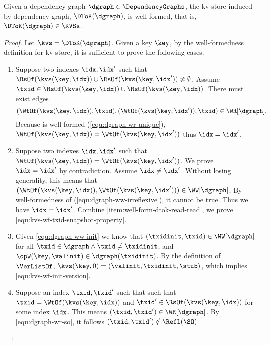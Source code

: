 \begin{toappendix}
\label{sec:proof-dep-graph-to-kvs}
\begin{proposition}
\label{prop:dtok-well-defined}
Given a dependency graph \( \dgraph \in \DependencyGraphs \), 
the kv-store induced by dependency graph, \( \DToK(\dgraph) \), is well-formed,
that is, \( \DToK(\dgraph) \in \KVSs\).
\end{proposition}
\begin{proof}
Let \( \kvs = \DToK(\dgraph) \).
Given a key \( \key \), by the well-formedness definition for kv-store,
it is sufficient to prove the following cases.
\begin{enumerate}
\item \label{item:well-form-dtok-read-read} Suppose two indexes \( \idx, \idx' \) 
    such that \( \RsOf(\kvs(\key,\idx)) \cup \RsOf(\kvs(\key,\idx')) \neq \emptyset \).
    Assume \( \txid \in \RsOf(\kvs(\key,\idx)) \cup \RsOf(\kvs(\key,\idx)) \).
    There must exist edges
    \[ (\WtOf(\kvs(\key,\idx)),\txid), (\WtOf(\kvs(\key,\idx')),\txid) \in \WR[\dgraph]. \]
    Because \dgraph is well-formed (\cref{equ:dgraph-wr-unique}), 
    \( \WtOf(\kvs(\key,\idx)) = \WtOf(\kvs(\key,\idx')) \) thus \( \idx = \idx' \).
\item Suppose two indexes \( \idx, \idx' \) 
    such that \( \WtOf(\kvs(\key,\idx)) = \WtOf(\kvs(\key,\idx')) \).
    We prove \( \idx = \idx' \) by contradiction.
    Assume \( \idx \neq \idx' \).
    Without losing generality, this means that \( (\WtOf(\kvs(\key,\idx)),\WtOf(\kvs(\key,\idx'))) \in \WW[\dgraph]\);
    By well-formedness of \dgraph (\cref{equ:dgraph-ww-irreflexive}), it cannot be true.
    Thus we have \( \idx = \idx' \).
    Combine \cref{item:well-form-dtok-read-read}, we prove \cref{equ:kvs-wf-txid-snapshot-property}.
\item Given \cref{equ:dgraph-ww-init} we know that \( (\txidinit, \txid) \in \WW[\dgraph]\) 
    for all \( \txid \in \dgraph \land \txid \neq \txidinit \);
    and \( \opW(\key,\valinit) \in \dgraph(\txidinit) \).
    By the definition of \( \VerListOf \), \( \kvs(\key,0) = (\valinit,\txidinit,\stub) \),
    which implies \cref{equ:kvs-wf-init-version}.
\item Suppose an index \( \txid, \txid' \) such that 
    such that \( \txid = \WtOf(\kvs(\key,\idx)) \) and \( \txid' \in \RsOf(\kvs(\key,\idx)) \)
    for some index \( \idx \).
    This means \( (\txid,\txid') \in \WR[\dgraph] \).
    By \cref{equ:dgraph-wr-so}, it follows \( (\txid,\txid') \notin \Refl(\SO)\) 

\end{enumerate}
\end{proof}
\end{toappendix}
